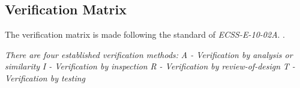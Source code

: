 \subsection{Verification Matrix}

The verification matrix is made following the standard of \textit{ECSS-E-10-02A}. \cite{ECSSSecretariat}.  

\textit{There are four established verification methods:}
\newline \textit{A - Verification by analysis or similarity}
\newline \textit{I - Verification by inspection}
\newline \textit{R - Verification by review-of-design}
\newline \textit{T - Verification by testing}

